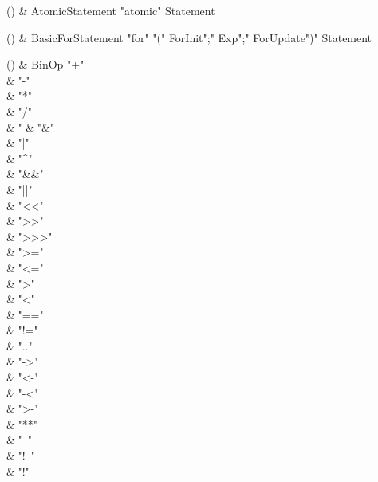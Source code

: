 \begin{bbgrammarappendix}

() & AtomicStatement \label{prod:AtomicStatement}  \: \xcd"atomic" Statement  \\


\end{bbgrammarappendix}

\begin{bbgrammarappendix}

() & BasicForStatement \label{prod:BasicForStatement}  \: \xcd"for" \xcd"(" ForInit\opt \xcd";" Exp\opt \xcd";" ForUpdate\opt \xcd")" Statement  \\


\end{bbgrammarappendix}

\begin{bbgrammarappendix}

() & BinOp \label{prod:BinOp}  \: \xcd"+"  \\

 &    \| \xcd"-" \\
 &    \| \xcd"*" \\
 &    \| \xcd"/" \\
 &    \| \xcd"%
 &    \| \xcd"&" \\
 &    \| \xcd"|" \\
 &    \| \xcd"^" \\
 &    \| \xcd"&&" \\
 &    \| \xcd"||" \\
 &    \| \xcd"<<" \\
 &    \| \xcd">>" \\
 &    \| \xcd">>>" \\
 &    \| \xcd">=" \\
 &    \| \xcd"<=" \\
 &    \| \xcd">" \\
 &    \| \xcd"<" \\
 &    \| \xcd"==" \\
 &    \| \xcd"!=" \\
 &    \| \xcd".." \\
 &    \| \xcd"->" \\
 &    \| \xcd"<-" \\
 &    \| \xcd"-<" \\
 &    \| \xcd">-" \\
 &    \| \xcd"**" \\
 &    \| \xcd"~" \\
 &    \| \xcd"!~" \\
 &    \| \xcd"!" \\

\end{bbgrammarappendix}

